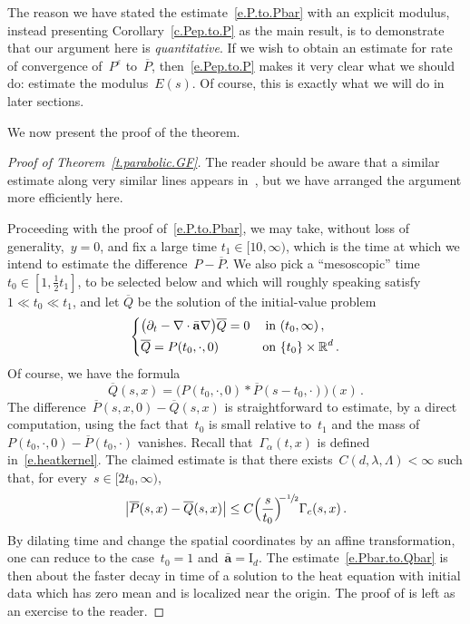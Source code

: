 \documentclass[11pt]{article} %
\numberwithin{equation}{section}
\theoremstyle{definition}
\let\originalleft\left
\let\originalright\right
\renewcommand{\left}{\mathopen{}\mathclose\bgroup\originalleft}
\renewcommand{\right}{\aftergroup\egroup\originalright}
\newcommand*{\Id}{\ensuremath{\mathrm{I}_d}}
\newcommand*{\Rd}{\ensuremath{\mathbb{R}^d}}
\newcommand{\eps}{\varepsilon}
\newcommand{\ep}{\eps}
\renewcommand{\a}{\mathbf{a}}
\newcommand{\ahom}{\bar{\a}}
\begin{document}
\smallskip

The reason we have stated the estimate~\eqref{e.P.to.Pbar} with an explicit modulus, instead presenting Corollary~\ref{c.Pep.to.P} as the main result, is to demonstrate that our argument here is \emph{quantitative}. If we wish to obtain an estimate for rate of convergence of~$P^\ep$ to~$\overline{P}$, then~\eqref{e.Pep.to.P} makes it very clear what we should do: estimate the modulus~$E(s)$. Of course, this is exactly what we will do in later sections. 

\smallskip

We now present the proof of the theorem. 

\begin{proof}[{Proof of Theorem~\ref{t.parabolic.GF}}]
The reader should be aware that a similar estimate along very similar lines appears in~\cite[Theorem 8.20]{AKMBook}, 
but we have arranged the argument more efficiently here. 

\smallskip

Proceeding with the proof of~\eqref{e.P.to.Pbar}, we may take, without loss of generality,~$y = 0$, and fix a large time $t_1\in [10,\infty)$, which is the time at which we intend to estimate the difference~$P-\overline{P}$. We also pick a ``mesoscopic'' time~$t_0 \in [1,\frac12 t_1]$, to be selected below and which will roughly speaking satisfy~$1 \ll t_0 \ll t_1$, and let $\overline{Q}$ be the solution of the initial-value problem 
\begin{equation*}
\left\{
\begin{aligned}
& \bigl( \partial_t - \nabla \cdot\ahom\nabla \bigr) \overline{Q}
= 0 & \mbox{in} & \ (t_0,\infty)\,, \\
&  \overline{Q} = P(t_0,\cdot,0) & \mbox{on} & \ \{ t_0 \} \times \Rd\,.
\end{aligned}
\right.
\end{equation*}
Of course, we have the formula
\begin{equation*}
\overline{Q}(s,x) = \bigl( P(t_0,\cdot,0) \ast \overline{P}(s-t_0,\cdot) \bigr)(x)
\,.
\end{equation*}
The difference~$\overline{P}(s,x,0) - \overline{Q}(s,x)$ is straightforward to estimate, by a direct computation, using the fact that~$t_0$ is small relative to~$t_1$ and the mass of~$P(t_0,\cdot,0) - \overline{P}(t_0,\cdot)$ vanishes. 
Recall that~$\Gamma_\alpha(t,x)$ is defined in~\eqref{e.heatkernel}. 
The claimed estimate is that there exists~$C(d,\lambda,\Lambda)<\infty$ such that, for every~$s \in [2t_0,\infty)$, 
\begin{equation}
\label{e.Pbar.to.Qbar}
\bigl| \overline{P}(s,x) - \overline{Q} (s,x)\bigr|
\leq 
C \Bigl( \frac s{t_0} \Bigr)^{\!\!-\sfrac12}
\Gamma_c (s,x)
\,.
\end{equation}
By dilating time and change the spatial coordinates by an affine transformation, one can reduce to the case~$t_0=1$ and~$\ahom =  \Id$. The estimate~\eqref{e.Pbar.to.Qbar} is then about the faster decay in time of a solution to the heat equation with initial data which has zero mean and is localized near the origin. The proof of is left as an exercise 
to the reader. 


\end{proof}
\end{document}
